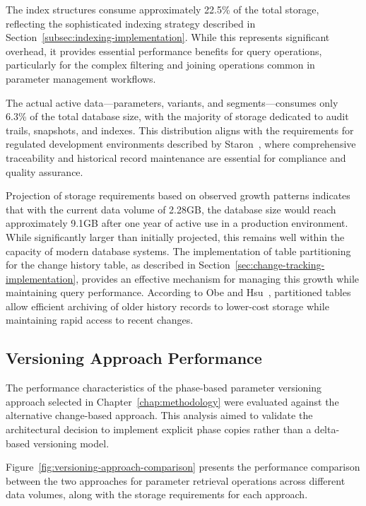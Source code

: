 The index structures consume approximately 22.5\% of the total storage, reflecting the sophisticated indexing strategy described in Section~\ref{subsec:indexing-implementation}. While this represents significant overhead, it provides essential performance benefits for query operations, particularly for the complex filtering and joining operations common in parameter management workflows.

The actual active data—parameters, variants, and segments—consumes only 6.3\% of the total database size, with the majority of storage dedicated to audit trails, snapshots, and indexes. This distribution aligns with the requirements for regulated development environments described by Staron~\cite{staron2021automotive}, where comprehensive traceability and historical record maintenance are essential for compliance and quality assurance.

Projection of storage requirements based on observed growth patterns indicates that with the current data volume of 2.28GB, the database size would reach approximately 9.1GB after one year of active use in a production environment. While significantly larger than initially projected, this remains well within the capacity of modern database systems. The implementation of table partitioning for the change history table, as described in Section~\ref{sec:change-tracking-implementation}, provides an effective mechanism for managing this growth while maintaining query performance. According to Obe and Hsu~\cite{obe2017postgresql}, partitioned tables allow efficient archiving of older history records to lower-cost storage while maintaining rapid access to recent changes.

\subsection{Versioning Approach Performance}
\label{subsec:versioning-approach-performance}

The performance characteristics of the phase-based parameter versioning approach selected in Chapter~\ref{chap:methodology} were evaluated against the alternative change-based approach. This analysis aimed to validate the architectural decision to implement explicit phase copies rather than a delta-based versioning model.

Figure~\ref{fig:versioning-approach-comparison} presents the performance comparison between the two approaches for parameter retrieval operations across different data volumes, along with the storage requirements for each approach.

